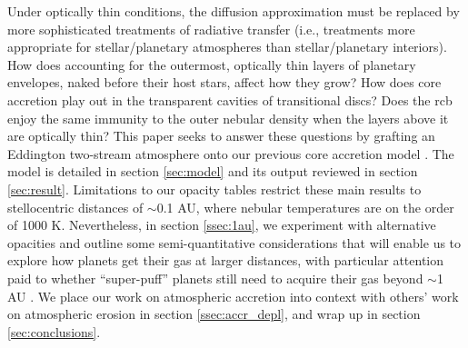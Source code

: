 \documentclass[fleqn,useAMS,usenatbib]{mnras}
\begin{document}
Under optically thin conditions, the diffusion approximation must
be replaced by more sophisticated treatments
of radiative transfer (i.e., treatments more appropriate
for stellar/planetary atmospheres than stellar/planetary interiors).
How does accounting for the outermost, optically thin
layers of planetary envelopes, naked before their host stars,
affect how they grow? How does core accretion play
out in the transparent cavities of transitional discs?
Does the rcb enjoy the same immunity to the outer nebular density
when the layers above it are optically thin?
This paper seeks to answer these questions
by grafting an Eddington two-stream atmosphere \citep{guillot10}
onto our previous core accretion model \citep{paper1,piso14}.
The model is detailed in section \ref{sec:model} and its
output reviewed in section \ref{sec:result}.
Limitations to our opacity tables restrict these main results
to stellocentric distances of $\sim$0.1 AU, where nebular temperatures
are on the order of 1000 K. Nevertheless, in section \ref{ssec:1au},
we experiment with alternative opacities and outline some
semi-quantitative considerations that will enable us to explore
how planets get their gas at larger distances, with particular
attention paid to whether ``super-puff''
planets still need to acquire their gas beyond $\sim$1 AU \citep{paper3}.
We place our work on atmospheric accretion into context with others'
work on atmospheric erosion in section \ref{ssec:accr_depl},
and wrap up in section \ref{sec:conclusions}.
\end{document}
